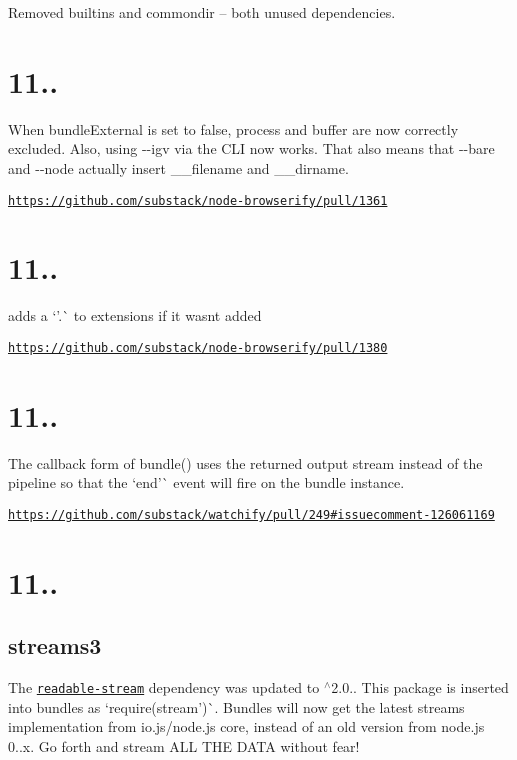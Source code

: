 Removed {\ttfamily builtins} and {\ttfamily commondir} – both unused dependencies.

\section*{11..}

When {\ttfamily bundle\+External} is set to {\ttfamily false}, {\ttfamily process} and {\ttfamily buffer} are now correctly excluded. Also, using {\ttfamily -\/-\/igv} via the C\+LI now works. That also means that {\ttfamily -\/-\/bare} and {\ttfamily -\/-\/node} actually insert {\ttfamily \+\_\+\+\_\+filename} and {\ttfamily \+\_\+\+\_\+dirname}.

\href{https://github.com/substack/node-browserify/pull/1361}{\tt https\+://github.\+com/substack/node-\/browserify/pull/1361}

\section*{11..}

adds a `'.\textquotesingle{}\`{} to extensions if it wasn\textquotesingle{}t added

\href{https://github.com/substack/node-browserify/pull/1380}{\tt https\+://github.\+com/substack/node-\/browserify/pull/1380}

\section*{11..}

The callback form of bundle() uses the returned output stream instead of the pipeline so that the `\textquotesingle{}end'\`{} event will fire on the bundle instance.

\href{https://github.com/substack/watchify/pull/249#issuecomment-126061169}{\tt https\+://github.\+com/substack/watchify/pull/249\#issuecomment-\/126061169}

\section*{11..}

\subsection*{streams3}

The \href{https://npmjs.com/package/readable-stream}{\tt {\ttfamily readable-\/stream}} dependency was updated to {\ttfamily $^\wedge$2.0.}. This package is inserted into bundles as `require(\textquotesingle{}stream')\`{}. Bundles will now get the latest streams implementation from io.\+js/node.js core, instead of an old version from node.\+js 0..\+x. Go forth and stream A\+LL T\+HE D\+A\+TA without fear!


